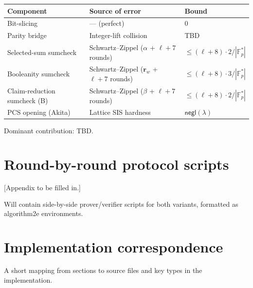 \documentclass[11pt,a4paper]{article}
\theoremstyle{definition}
\theoremstyle{remark}
\newcommand{\akF}{\mathbb{F}_{p}}                %
\newcommand{\negl}{\mathsf{negl}}
\begin{document}
\begin{table}[h]
\centering
\begin{tabular}{lll}
\toprule
Component & Source of error & Bound \\
\midrule
Bit-slicing                 & --- (perfect)                            & $0$ \\
Parity bridge               & Integer-lift collision                   & TBD \\
Selected-sum sumcheck       & Schwartz–Zippel ($\alpha$ + $\ell + 7$ rounds) & $\le (\ell + 8) \cdot 2 / |\akF^*|$ \\
Booleanity sumcheck         & Schwartz–Zippel ($\mathbf{r}_w$ + $\ell + 7$ rounds) & $\le (\ell + 8) \cdot 3 / |\akF^*|$ \\
Claim-reduction sumcheck (B)& Schwartz–Zippel ($\beta$ + $\ell + 7$ rounds) & $\le (\ell + 8) \cdot 2 / |\akF^*|$ \\
PCS opening (Akita)         & Lattice SIS hardness                     & $\negl(\lambda)$ \\
\bottomrule
\end{tabular}
\end{table}

Dominant contribution: TBD.


\appendix

\section{Round-by-round protocol scripts}
\label{app:scripts}

\textsf{[Appendix to be filled in.]}

Will contain side-by-side prover/verifier scripts for both variants,
formatted as algorithm2e environments.


\section{Implementation correspondence}
\label{app:impl}

A short mapping from sections to source files and key types in the
implementation.
\end{document}
